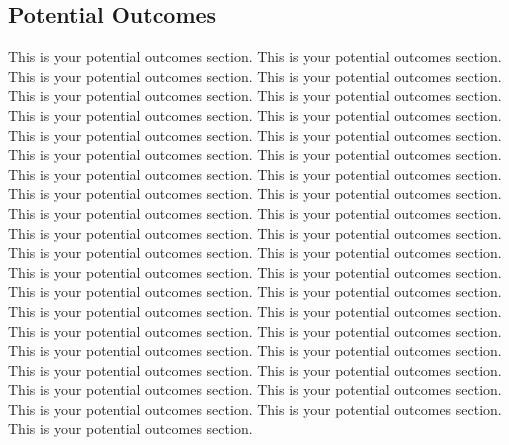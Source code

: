 {
\begin{doublespacing}
\begin{flushleft}

\section{Potential Outcomes}

This is your potential outcomes section. This is your potential outcomes section. This is your potential outcomes section. This is your potential outcomes section. This is your potential outcomes section. This is your potential outcomes section. This is your potential outcomes section. This is your potential outcomes section. This is your potential outcomes section. This is your potential outcomes section. This is your potential outcomes section. This is your potential outcomes section. This is your potential outcomes section. This is your potential outcomes section. This is your potential outcomes section. This is your potential outcomes section. This is your potential outcomes section. This is your potential outcomes section. This is your potential outcomes section. This is your potential outcomes section. This is your potential outcomes section. This is your potential outcomes section. This is your potential outcomes section. This is your potential outcomes section. This is your potential outcomes section. This is your potential outcomes section. This is your potential outcomes section. This is your potential outcomes section. This is your potential outcomes section. This is your potential outcomes section. This is your potential outcomes section. This is your potential outcomes section. This is your potential outcomes section. This is your potential outcomes section. This is your potential outcomes section. This is your potential outcomes section. This is your potential outcomes section. This is your potential outcomes section. This is your potential outcomes section. 



\end{flushleft}
\end{doublespacing}
}